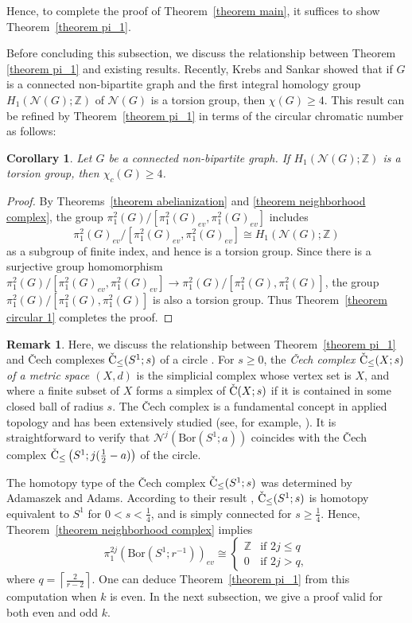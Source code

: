 \documentclass[11pt, amsfonts]{amsart}
\numberwithin{equation}{section}
\newtheorem{corollary}[thm]{Corollary}
\theoremstyle{definition}
\newtheorem{remark}[thm]{Remark}
\theoremstyle{remark}
\newcommand{\ZZ}{\mathbb{Z}}
\newcommand{\bC}{\check{\rm C}}
\newcommand{\N}{\mathcal{N}}
\newcommand{\Bor}{\mathrm{Bor}}
\begin{document}
Hence, to complete the proof of Theorem~\ref{theorem main}, it suffices to show Theorem~\ref{theorem pi_1}.

Before concluding this subsection, we discuss the relationship between Theorem \ref{theorem pi_1} and existing results. Recently, Krebs and Sankar \cite[Theorem~1.4]{KrebsSankar} showed that if $G$ is a connected non-bipartite graph and the first integral homology group $H_1(\N(G) ; \ZZ)$ of $\N(G)$ is a torsion group, then $\chi(G) \ge 4$. This result can be refined by Theorem~\ref{theorem pi_1} in terms of the circular chromatic number as follows:

\begin{corollary} \label{corollary KS}
Let $G$ be a connected non-bipartite graph. If $H_1(\N(G); \ZZ)$ is a torsion group, then $\chi_c(G) \ge 4$.
\end{corollary}
\begin{proof}
By Theorems~\ref{theorem abelianization} and \ref{theorem neighborhood complex}, the group $\pi_1^2(G) / [\pi_1^2(G)_{ev}, \pi_1^2(G)_{ev}]$ includes
\[ \pi^2_1(G)_{ev} / [\pi^2_1(G)_{ev}, \pi^2_1(G)_{ev}] \cong H_1(\N(G); \ZZ)\]
as a subgroup of finite index, and hence is a torsion group. Since there is a surjective group homomorphism $\pi^2_1(G) / [\pi^2_1(G)_{ev}, \pi^2_1(G)_{ev}] \to \pi^2_1(G) / [\pi^2_1(G), \pi^2_1(G)]$, the group $\pi^2_1(G) / [\pi^2_1(G), \pi^2_1(G)]$ is also a torsion group. Thus Theorem~\ref{theorem circular 1} completes the proof.
\end{proof}


\begin{remark}
Here, we discuss the relationship between Theorem~\ref{theorem pi_1} and \v{C}ech complexes $\bC_{\le}(S^1; s)$ of a circle \cite{AA}. For $s \ge 0$, the \emph{\v{C}ech complex $\bC_{\le}(X; s)$ of a metric space $(X, d)$} is the simplicial complex whose vertex set is $X$, and where a finite subset of $X$ forms a simplex of $\bC(X; s)$ if it is contained in some closed ball of radius $s$. The \v{C}ech complex is a fundamental concept in applied topology and has been extensively studied (see, for example, \cite{Carlsson, EH}). It is straightforward to verify that $\N^j(\Bor(S^1; a))$ coincides with the \v{C}ech complex $\bC_{\le} \left(S^1; j(\frac{1}{2} - a) \right)$ of the circle.

The homotopy type of the \v{C}ech complex $\bC_{\le}(S^1; s)$ was determined by Adamaszek and Adams. According to their result \cite[Theorem~1.1]{AA}, $\bC_{\le}(S^1; s)$ is homotopy equivalent to $S^1$ for $0 < s < \frac{1}{4}$, and is simply connected for $s \ge \frac{1}{4}$. Hence, Theorem~\ref{theorem neighborhood complex} implies
\[
\pi_1^{2j}(\Bor(S^1 ; r^{-1}))_{ev} \cong \begin{cases}
\ZZ & \text{if } 2j \le q \\
0 & \text{if } 2j > q,
\end{cases}
\]
where $q = \left\lceil \frac{2}{r - 2} \right\rceil $. One can deduce Theorem~\ref{theorem pi_1} from this computation when $k$ is even. In the next subsection, we give a proof valid for both even and odd $k$.
\end{remark}
\end{document}
